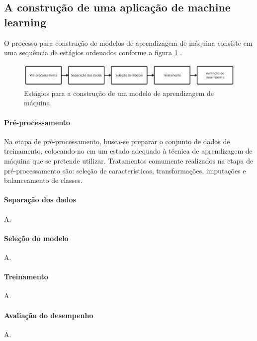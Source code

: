 \subsection{A construção de uma aplicação de machine learning}

O processo para construção de modelos de aprendizagem de máquina consiste em uma sequência de estágios ordenados conforme a figura \ref{fig:processo} \cite{Greener2021}.

\begin{figure}[h!]
    \centering
    \includegraphics[width=\textwidth]{./02-desenvolvimento/01-machine-learning/imagens/processo.png}
    \caption{Estágios para a construção de um modelo de aprendizagem de máquina.}
    \label{fig:processo}
\end{figure}

\paragraph{Pré-processamento}

Na etapa de pré-processamento, busca-se preparar o conjunto de dados de treinamento, colocando-no em um estado adequado à técnica
de aprendizagem de máquina que se pretende utilizar. Tratamentos comumente realizados na etapa de pré-processamento são: seleção de
características, transformações, imputações e balanceamento de classes.

\paragraph{Separação dos dados}

A.

\paragraph{Seleção do modelo}

A.

\paragraph{Treinamento}

A.

\paragraph{Avaliação do desempenho}

A.